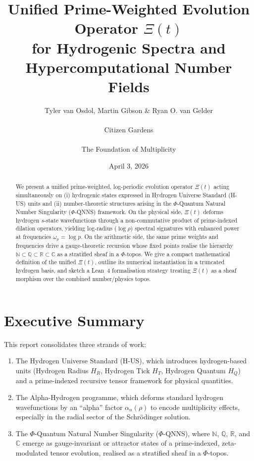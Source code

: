 \documentclass[11pt]{article}
\title{Unified Prime-Weighted Evolution Operator \texorpdfstring{$\Xi(t)$}{}\\
for Hydrogenic Spectra and Hypercomputational Number Fields}
\author{Tyler van Osdol, Martin Gibson \& Ryan O. van Gelder \\ \\ Citizen Gardens \\ \\ The Foundation of Multiplicity}
\date{April 3, 2026}
\begin{document}
\maketitle

\begin{abstract}
We present a unified prime-weighted, log-periodic evolution operator
$\Xi(t)$ acting simultaneously on (i) hydrogenic states expressed in
Hydrogen Universe Standard (H-US) units and (ii) number-theoretic
structures arising in the $\Phi$-Quantum Natural Number Singularity
($\Phi$-QNNS) framework. On the physical side, $\Xi(t)$ deforms
hydrogen $s$-state wavefunctions through a non-commutative product of
prime-indexed dilation operators, yielding log-radius ($\log\rho$)
spectral signatures with enhanced power at frequencies $\omega_p =
\log p$. On the arithmetic side, the same prime weights and
frequencies drive a gauge-theoretic recursion whose fixed points
realise the hierarchy $\mathbb{N} \subset \mathbb{Q} \subset
\mathbb{R} \subset \mathbb{C}$ as a stratified sheaf in a
$\Phi$-topos. We give a compact mathematical definition of the unified
$\Xi(t)$, outline its numerical instantiation in a truncated hydrogen
basis, and sketch a Lean~4 formalisation strategy treating $\Xi(t)$ as
a sheaf morphism over the combined number/physics topos.
\end{abstract}
\newpage
\tableofcontents
\newpage
\section{Executive Summary}

This report consolidates three strands of work:
\begin{enumerate}[label=\textbf{(\alph*)}]
  \item The Hydrogen Universe Standard (H-US), which introduces
  hydrogen-based units (Hydrogen Radius $H_R$, Hydrogen Tick $H_T$,
  Hydrogen Quantum $H_Q$) and a prime-indexed recursive tensor
  framework for physical quantities.

  \item The Alpha-Hydrogen programme, which deforms standard hydrogen
  wavefunctions by an ``alpha'' factor $\alpha_n(\rho)$ to encode
  multiplicity effects, especially in the radial sector of the
  Schr\"odinger solution.

  \item The $\Phi$-Quantum Natural Number Singularity ($\Phi$-QNNS),
  where $\mathbb{N}$, $\mathbb{Q}$, $\mathbb{R}$, and $\mathbb{C}$
  emerge as gauge-invariant or attractor states of a prime-indexed,
  zeta-modulated tensor evolution, realised as a stratified sheaf in a
  $\Phi$-topos.
\end{enumerate}
\end{document}

